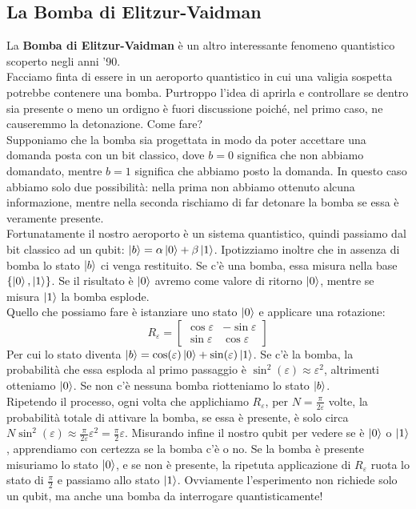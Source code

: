 \documentclass{article}
\begin{document}
    \subsection{La Bomba di Elitzur-Vaidman}
    La \textbf{Bomba di Elitzur-Vaidman} è un altro interessante fenomeno quantistico scoperto negli anni '90.
    \\
    Facciamo finta di essere in un aeroporto quantistico in cui una valigia sospetta potrebbe contenere una bomba. Purtroppo l'idea di aprirla e controllare se dentro sia presente o meno un ordigno è fuori discussione poiché, nel primo caso, ne causeremmo la detonazione. Come fare?
    \\
    Supponiamo che la bomba sia progettata in modo da poter accettare una domanda posta con un bit classico, dove $b= 0$ significa che non abbiamo domandato, mentre $b=1$ significa che abbiamo posto la domanda. In questo caso abbiamo solo due possibilità: nella prima non abbiamo ottenuto alcuna informazione, mentre nella seconda rischiamo di far detonare la bomba se essa è veramente presente.
    \\
    Fortunatamente il nostro aeroporto è un sistema quantistico, quindi passiamo dal bit classico ad un qubit: $\ket{b} = \alpha\ket{0}+ \beta\ket{1}$. Ipotizziamo inoltre che in assenza di bomba lo stato $\ket{b}$ ci venga restituito. Se c'è una bomba, essa misura nella base $\{\ket{0},\ket{1}\}$. Se il risultato è $\ket{0}$ avremo come valore di ritorno $\ket{0}$, mentre se misura $\ket{1}$ la bomba esplode.
    \medskip
    \\
    Quello che possiamo fare è istanziare uno stato $\ket{0}$ e applicare una rotazione:
    \[
    R_\varepsilon =  \begin{bmatrix}
        \cos \varepsilon & -\sin \varepsilon \\
        \sin \varepsilon & \cos\varepsilon
    \end{bmatrix}
    \]
    Per cui lo stato diventa $\ket{b} = \cos(\varepsilon) \ket{0}+ \sin(\varepsilon)\ket{1}$. Se c'è la bomba, la probabilità che essa esploda al primo passaggio è $\sin^2(\varepsilon)\approx\varepsilon^2$, altrimenti otteniamo $\ket{0}$. Se non c'è nessuna bomba riotteniamo lo stato $\ket{b}$. 
    \\
    Ripetendo il processo, ogni volta che applichiamo $R_\varepsilon$, per $N = \frac{\pi}{2\varepsilon}$ volte, la probabilità totale di attivare la bomba, se essa è presente, è solo circa $N \sin^2(\varepsilon) \approx \frac{\pi}{2\varepsilon} \varepsilon^2 = \frac{\pi}{2} \varepsilon$. Misurando infine il nostro qubit per vedere se è $\ket{0}$ o $\ket{1}$, apprendiamo con certezza se la bomba c'è o no. Se la bomba è presente misuriamo lo stato $\ket{0}$, e se non è presente, la ripetuta applicazione di $R_\varepsilon$ ruota lo stato di $\frac{\pi}{2}$ e passiamo allo stato $\ket{1}$. Ovviamente l'esperimento non richiede solo un qubit, ma anche una bomba da interrogare quantisticamente!
\end{document}
